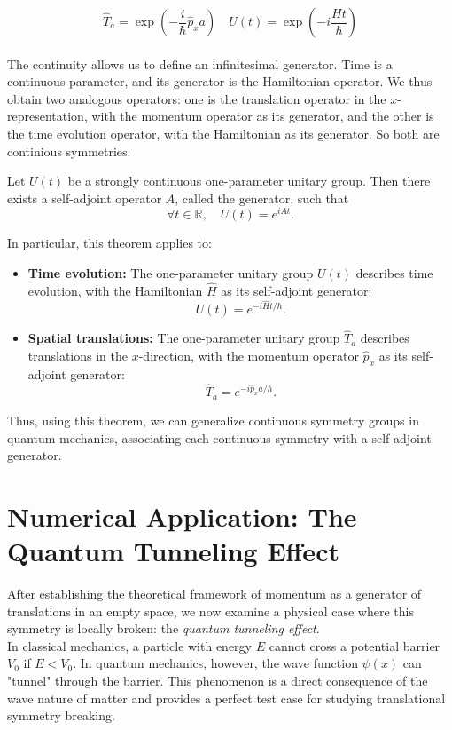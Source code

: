 \documentclass{article}
\begin{document}
$$
	\hat{T}_a = \exp\left(-\frac{i}{\hbar} \hat{p}_x a \right) \quad  U(t) = \exp\!\left( -i \frac{H t}{\hbar}\right)
$$
\\
The continuity allows us to define an infinitesimal generator. Time is a continuous parameter, and its generator is the Hamiltonian operator. We thus obtain two analogous operators: one is the translation operator in the $x$-representation, with the momentum operator as its generator, and the other is the time evolution operator, with the Hamiltonian as its generator.
So both are continious symmetries.


\begin{theorem}
	Let $U(t)$ be a strongly continuous one-parameter unitary group. Then there exists a self-adjoint operator $A$, called the generator, such that
	$$
	\forall t \in \mathbb{R}, \quad U(t) = e^{i A t}.
	$$
	
	In particular, this theorem applies to:
	
	\begin{itemize}
		\item \textbf{Time evolution:} The one-parameter unitary group $U(t)$ describes time evolution, with the Hamiltonian $\hat{H}$ as its self-adjoint generator:
		$$
		U(t) = e^{-i \hat{H} t / \hbar}.
		$$
		
		\item \textbf{Spatial translations:} The one-parameter unitary group $\hat{T}_a$ describes translations in the $x$-direction, with the momentum operator $\hat{p}_x$ as its self-adjoint generator:
		$$
		\hat{T}_a = e^{-i \hat{p}_x a / \hbar}.
		$$
	\end{itemize}
\end{theorem}
Thus, using this theorem, we can generalize continuous symmetry groups in quantum mechanics, associating each continuous symmetry with a self-adjoint generator.




\section{\textbf{Numerical Application: The Quantum Tunneling Effect}}

After establishing the theoretical framework of momentum as a generator of translations in an empty space, we now examine a physical case where this symmetry is locally broken: the \emph{quantum tunneling effect}.\\

In classical mechanics, a particle with energy $E$ cannot cross a potential barrier $V_0$ if $E < V_0$. In quantum mechanics, however, the wave function $\psi(x)$ can "tunnel" through the barrier. This phenomenon is a direct consequence of the wave nature of matter and provides a perfect test case for studying translational symmetry breaking.\\
\end{document}
